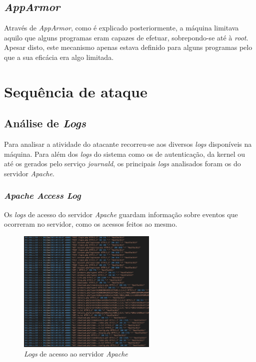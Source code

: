 \documentclass[10pt,english]{article}
\begin{document}
\subsection{\textit{AppArmor}}
\par Através de \textit{AppArmor}, como é explicado posteriormente, a máquina limitava aquilo que alguns programas eram capazes de efetuar, sobrepondo-se até à \textit{root}. Apesar disto, este mecanismo apenas estava definido para alguns programas pelo que a sua eficácia era algo limitada.

\clearpage

\section{Sequência de ataque}

\subsection{Análise de \textit{Logs}}

\par Para analisar a atividade do atacante recorreu-se aos diversos \textit{logs} disponíveis na máquina. Para além dos \textit{logs} do sistema como os de autenticação, da kernel ou até os gerados pelo serviço \textit{journald}, os principais \textit{logs} analisados foram os do servidor \textit{Apache}.

\subsubsection{\textit{Apache Access Log}}

\par Os \textit{logs} de acesso do servidor \textit{Apache} guardam informação sobre eventos que ocorreram no servidor, como os acessos feitos ao mesmo.

\begin{figure}[h]
    \centering
    \includegraphics[width=250]{images/acesslog.png}
    \caption{\textit{Logs} de acesso ao servidor \textit{Apache}}
\end{figure}
\end{document}

